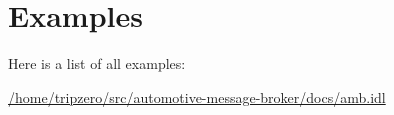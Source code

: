 \section{Examples}
Here is a list of all examples\-:\begin{DoxyCompactItemize}
\item 
\hyperlink{_2home_2tripzero_2src_2automotive-message-broker_2docs_2amb_8idl-example}{/home/tripzero/src/automotive-\/message-\/broker/docs/amb.\-idl}
\end{DoxyCompactItemize}
